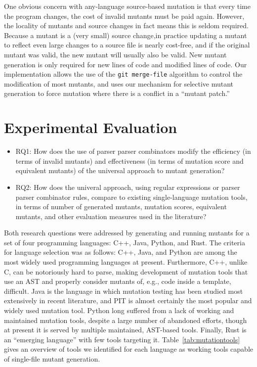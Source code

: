 \documentclass[acmsmall,screen,review,anonymous]{acmart}
\begin{document}
{One obvious concern with any-language source-based mutation is that every time the
program changes, the cost of invalid mutants must be paid again.
However, the locality of mutants and source changes in fact means this
is seldom required.   Because a mutant is a (very
small) source change,in practice updating a mutant to
reflect even large changes to a source file is nearly cost-free, and if the
original mutant was valid, the new mutant will usually also be valid.
New mutant generation is only required for new lines of code and
modified lines of code.  Our
implementation allows the use of the {\tt git merge-file} algorithm to control the
modification of most mutants, and uses our mechanism for
selective mutant generation to force mutation where
there is a conflict in a ``mutant patch.''


\section{Experimental Evaluation}

\begin{itemize}

  \item{RQ1:}  How does the use of parser parser combinators modify 
    the efficiency (in terms of invalid mutants) and effectiveness (in
    terms of mutation score and equivalent mutants) of the universal
    approach to mutant generation?

\item{RQ2:}  How does the univeral approach, using regular expressions
  or parser parser combinator rules, compare to existing
  single-language mutation tools, in terms of number of generated
  mutants, mutation scores, equivalent mutants, and other evaluation measures used in the literature?

\end{itemize}


Both research questions were addressed by generating and running
mutants for a set of four programming languages: C++, Java, Python,
and Rust.  The criteria for language selection was as follows: C++,
Java, and Python are among the most widely used programming languages
at present.  Furthermore, C++, unlike C, can be notoriously hard to
parse, making development of mutation tools that use an AST and
properly consider mutants of, e.g., code inside a template,
difficult.  Java is the language in which mutation testing has been
studied most extensively in recent literature, and PIT is almost
certainly the most popular and widely used mutation tool.  Python long
suffered from a lack of working and maintained mutation tools, despite
a large number of abandoned efforts, though at present it is served by
multiple maintained, AST-based tools.  Finally, Rust is an ``emerging
language'' with few tools targeting it.  Table~\ref{tab:mutationtools}
gives an overview of tools we identified for each language as working tools
capable of single-file mutant generation.

}
\end{document}
